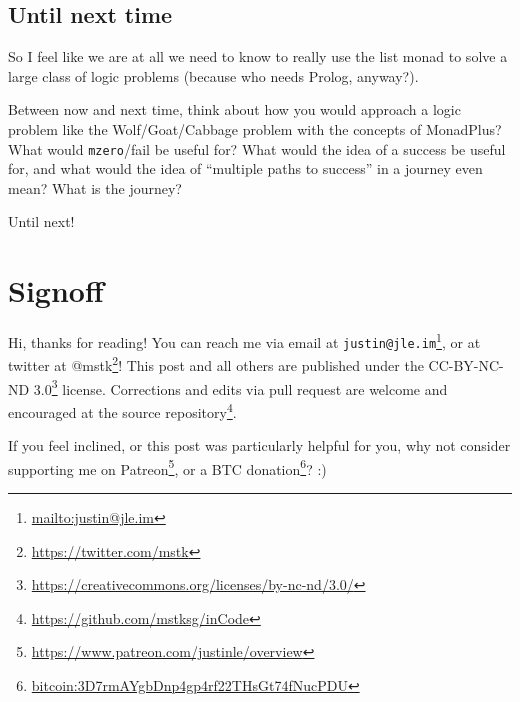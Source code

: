 \documentclass[]{article}
\renewcommand{\href}[2]{#2\footnote{\url{#1}}}
\begin{document}
\hypertarget{until-next-time}{%
\subsection{Until next time}\label{until-next-time}}

So I feel like we are at all we need to know to really use the list monad to
solve a large class of logic problems (because who needs Prolog, anyway?).

Between now and next time, think about how you would approach a logic problem
like the Wolf/Goat/Cabbage problem with the concepts of MonadPlus? What would
\texttt{mzero}/fail be useful for? What would the idea of a success be useful
for, and what would the idea of ``multiple paths to success'' in a journey even
mean? What is the journey?

Until next!

\hypertarget{signoff}{%
\section{Signoff}\label{signoff}}

Hi, thanks for reading! You can reach me via email at
\href{mailto:justin@jle.im}{\nolinkurl{justin@jle.im}}, or at twitter at
\href{https://twitter.com/mstk}{@mstk}! This post and all others are published
under the \href{https://creativecommons.org/licenses/by-nc-nd/3.0/}{CC-BY-NC-ND
3.0} license. Corrections and edits via pull request are welcome and encouraged
at \href{https://github.com/mstksg/inCode}{the source repository}.

If you feel inclined, or this post was particularly helpful for you, why not
consider \href{https://www.patreon.com/justinle/overview}{supporting me on
Patreon}, or a \href{bitcoin:3D7rmAYgbDnp4gp4rf22THsGt74fNucPDU}{BTC donation}?
:)
\end{document}
